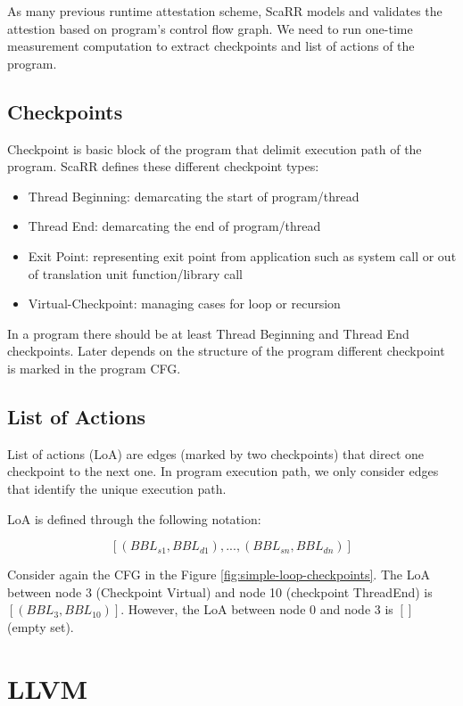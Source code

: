 As many previous runtime attestation scheme, ScaRR models and validates the
attestion based on program's control flow graph. We need to run one-time
measurement computation to extract checkpoints and list of actions of the
program.

\subsection{Checkpoints} \label{sec:scarr-checkpoints} Checkpoint is basic block
of the program that delimit execution path of the program. ScaRR defines these
different checkpoint types:
\begin{itemize}
    \item Thread Beginning: demarcating the start of program/thread
    \item Thread End: demarcating the end of program/thread
    \item Exit Point: representing exit point from application such as system
    call or out of translation unit function/library call
    \item Virtual-Checkpoint: managing cases for loop or recursion
\end{itemize}

In a program there should be at least Thread Beginning and Thread End
checkpoints. Later depends on the structure of the program different checkpoint
is marked in the program CFG.

\subsection{List of Actions}

List of actions (LoA) are edges (marked by two checkpoints) that direct one
checkpoint to the next one. In program execution path, we only consider edges
that identify the unique execution path.

LoA is defined through the following notation:


$$[(BBL_{s1},BBL_{d1}),...,(BBL_{sn},BBL_{dn})]$$

Consider again the CFG in the Figure \ref{fig:simple-loop-checkpoints}. The LoA
between node 3 (Checkpoint Virtual) and node 10 (checkpoint ThreadEnd) is
$[(BBL_3, BBL_{10})]$. However, the LoA between node 0 and node 3 is $[]$ (empty
set).


\section{LLVM}
\label{sec:llvm}

